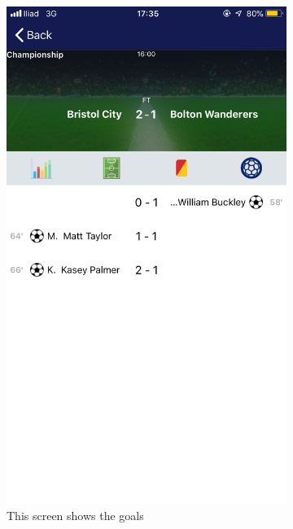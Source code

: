 \documentclass[numbers=noenddot, 12pt, a4paper, oneside]{scrbook}
\begin{document}
\begin{figure}[H]
	\begin{subfigure}{.5\textwidth}
		\centering
		\includegraphics[width=.8\linewidth]{images/Screen/Goal}
		\caption{This screen shows the goals}
	\end{subfigure}
	\begin{subfigure}{.5\textwidth}
		\centering

\end{subfigure}
\end{figure}
\end{document}
